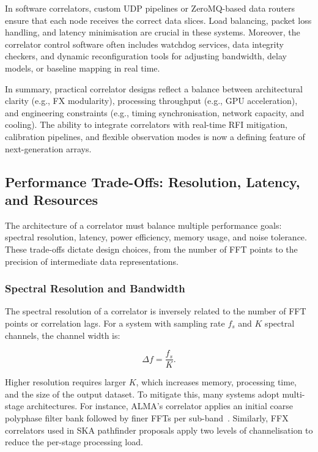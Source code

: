         In software correlators, custom UDP pipelines or ZeroMQ-based data routers ensure that each node receives the correct data slices. Load balancing, packet loss handling, and latency minimisation are crucial in these systems. Moreover, the correlator control software often includes watchdog services, data integrity checkers, and dynamic reconfiguration tools for adjusting bandwidth, delay models, or baseline mapping in real time.

        In summary, practical correlator designs reflect a balance between architectural clarity (e.g., FX modularity), processing throughput (e.g., GPU acceleration), and engineering constraints (e.g., timing synchronisation, network capacity, and cooling). The ability to integrate correlators with real-time RFI mitigation, calibration pipelines, and flexible observation modes is now a defining feature of next-generation arrays.

    \subsection{Performance Trade-Offs: Resolution, Latency, and Resources}
        The architecture of a correlator must balance multiple performance goals: spectral resolution, latency, power efficiency, memory usage, and noise tolerance. These trade-offs dictate design choices, from the number of FFT points to the precision of intermediate data representations.

        \subsubsection{Spectral Resolution and Bandwidth}
        The spectral resolution of a correlator is inversely related to the number of FFT points or correlation lags. For a system with sampling rate \( f_s \) and \( K \) spectral channels, the channel width is:

        \begin{equation}
            \Delta f = \frac{f_s}{K}.
        \end{equation}

        Higher resolution requires larger \( K \), which increases memory, processing time, and the size of the output dataset. To mitigate this, many systems adopt multi-stage architectures. For instance, ALMA’s correlator applies an initial coarse polyphase filter bank followed by finer FFTs per sub-band~\cite{Escoffier2007}. Similarly, FFX correlators used in SKA pathfinder proposals apply two levels of channelisation to reduce the per-stage processing load.

